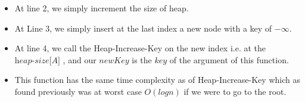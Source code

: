 
 
\begin{algorithm}[H]
 \begin{algorithmic}[1]
     \EndFunction
         \end{algorithmic}
\end{algorithm}

\begin{itemize}
    \item At line 2, we simply increment the size of heap.
    \item At Line 3, we simply insert at the last index a new node with a key of $- \infty$. 
    \item At line 4, we call the Heap-Increase-Key on the new index i.e. at the $\textit{heap-size[A]}$ , and our $newKey$ is the $key$ of the argument of this function.
    \item This function has the same time complexity as of Heap-Increase-Key which as found previously was at worst case $O(log n)$ if we were to go to the root.
\end{itemize}